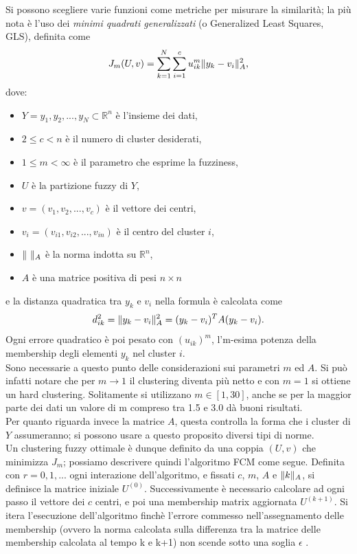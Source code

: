 \documentclass[oneside, openany]{book}
\DeclarePairedDelimiter{\norma}{\lVert}{\rVert}
\begin{document}
		Si possono scegliere varie funzioni come metriche per misurare la similarità; la più nota è l'uso dei \textit{minimi quadrati generalizzati} (o Generalized Least Squares, GLS), definita come
		\[
			J_m(U, v)=\sum_{k=1}^{N}\sum_{i=1}^{c}u_{ik}^m\norma{y_k-v_i}^2_A\text{,}
		\]
		dove:
		\begin{itemize}
			\item $Y = {y_1, y_2, ..., y_N} \subset \mathbb{R}^n$ è l'insieme dei dati, 
			\item $2 \leq c < n$ è il numero di cluster desiderati,
			\item $1 \leq m <\infty$ è il parametro che esprime la fuzziness,
			\item $U$ è la partizione fuzzy di $Y$,
			\item $v = (v_1, v_2, ..., v_c)$ è il vettore dei centri,
			\item $v_i = (v_{i1}, v_{i2}, ..., v_{in})$ è il centro del cluster $i$,
			\item $\norma{\textit{ }}_A$ è la norma indotta su $\mathbb{R}^n$,
			\item $A$ è una matrice positiva di pesi $n\times n$
		\end{itemize}
		e la distanza quadratica tra $y_k$ e $v_i$ nella formula è calcolata come
		\[
			d^2_{ik} = \norma{y_k-v_i}^2_A = (y_k-v_i)^TA(y_k-v_i)\text{.}
		\] 	
		Ogni errore quadratico è poi pesato con $(u_{ik})^m$, l'm-esima potenza della membership degli elementi $y_k$ nel cluster $i$.\\
		Sono necessarie a questo punto delle considerazioni sui parametri $m$ ed $A$. Si può infatti notare che per $m\rightarrow 1$ il clustering diventa più netto e con $m=1$ si ottiene un hard clustering. Solitamente si utilizzano $m \in [1,30]$, anche se per la maggior parte dei dati un valore di m compreso tra 1.5 e 3.0 dà buoni risultati. \\
		Per quanto riguarda invece la matrice $A$, questa controlla la forma che i cluster di $Y$ assumeranno; si possono usare a questo proposito diversi tipi di norme.\\
		
		Un clustering fuzzy ottimale è dunque definito da una coppia $(U, v)$ che minimizza $J_m$; possiamo descrivere quindi l'algoritmo FCM come segue.
		Definita con $r=0,1, ...$ ogni interazione dell'algoritmo, e fissati $c$, $m$, $A$ e $\norma{k}_A$, si definisce la matrice iniziale $U^{(0)}$. Successivamente è necessario calcolare ad ogni passo il vettore dei $c$ centri, e poi una membership matrix aggiornata $U^{(k+1)}$. Si itera l'esecuzione dell'algoritmo finchè l'errore commesso nell'assegnamento delle membership (ovvero la norma calcolata sulla differenza tra la matrice delle membership calcolata al tempo k e k+1) non scende sotto una soglia $\epsilon$ \cite{bib:fcm}.\\
		
\end{document}

